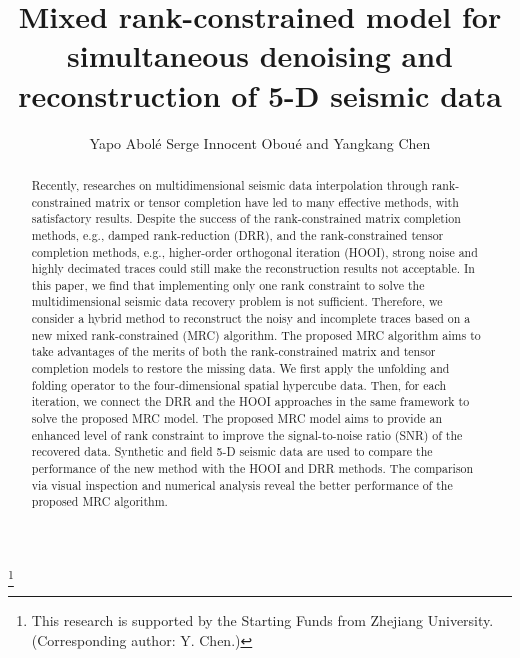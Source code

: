 \DeclareRobustCommand{\old}[1]{}
\DeclareRobustCommand{\new}[1]{#1}
\DeclareRobustCommand{\dlo}[1]{}
\DeclareRobustCommand{\wen}[1]{#1}
\makeatletter
\newcommand\fs@norules{\def\@fs@cfont{\bfseries}\let\@fs@capt\floatc@ruled
	\def\@fs@pre{}%
	\def\@fs@post{}%
	\def\@fs@mid{\kern3pt}%
	\let\@fs@iftopcapt\iftrue}
\makeatother
{}
\title{Mixed rank-constrained model for simultaneous denoising and reconstruction of 5-D seismic data}
	
\author{Yapo Abol{\'e} Serge Innocent Obou{\'e} and Yangkang Chen}

\address{Y.A.S.I. Obou{\'e} and Y. Chen are with School of Earth Sciences, Key Laboratory of Geoscience Big Data and Deep Resource of Zhejiang Province, Zhejiang University, Hangzhou, Zhejiang Province, China, 310027, obouesonofgod1@gmail.com\&chenyk2016@gmail.com.}

\thanks{This research is supported by the Starting Funds from Zhejiang University. (Corresponding author: Y. Chen.)}


\maketitle

\begin{abstract}
Recently, researches on multidimensional seismic data interpolation through rank-constrained matrix or tensor completion have led to many effective methods, with satisfactory results. Despite the success of the rank-constrained matrix completion methods, e.g., damped rank-reduction (DRR), and the rank-constrained tensor completion methods, e.g., higher-order orthogonal iteration (HOOI), strong noise and highly decimated traces could still make the reconstruction results not acceptable. In this paper, we find that implementing only one rank constraint to solve the multidimensional seismic data recovery problem is not sufficient. Therefore, we consider a hybrid method to reconstruct the noisy and incomplete traces based on a new mixed rank-constrained (MRC) algorithm. The proposed MRC algorithm aims to take advantages of the merits of both the rank-constrained matrix and tensor completion models to restore the missing data. We first apply the unfolding and folding operator to the four-dimensional spatial hypercube data. Then, for each iteration, we connect the DRR and the HOOI approaches in the same framework to solve the proposed MRC model. The proposed MRC model aims to provide an enhanced level of rank constraint to improve the signal-to-noise ratio (SNR) of the recovered data. Synthetic and field 5-D seismic data are used to compare the performance of the new method with the HOOI and DRR methods. The comparison via visual inspection and numerical analysis reveal the better performance of the proposed MRC algorithm.
\end{abstract}

